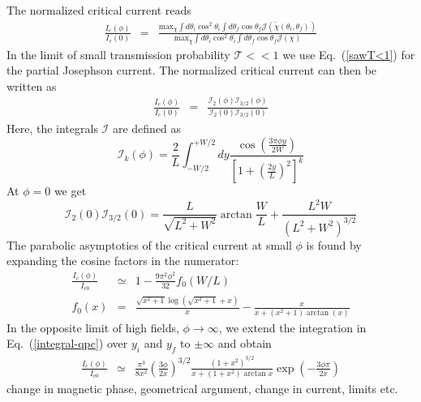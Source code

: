 The normalized critical current reads
\begin{eqnarray}
\frac{I_c(\phi)}{I_c(0)} &=& \frac{ \text{max}_{\chi} \int d \theta_i \cos^2 \theta_i\int d \theta_f \cos \theta_f \mathcal{J}(\tilde{\chi}(\theta_i, \theta_f)) }{ \text{max}_{\chi} \int d \theta_i \cos^2 \theta_i\int d \theta_f \cos \theta_f \mathcal{J}(\chi) }
\end{eqnarray}
In the limit of small transmission probability $\mathcal{T} << 1$ we use Eq.~(\ref{sawT<1}) for the partial Josephson current. The normalized critical current can then be written as 
\begin{eqnarray}
\frac{I_c(\phi)}{I_c(0)} &=& \frac{\mathcal{I}_2(\phi)\mathcal{I}_{3/2}(\phi)}{\mathcal{I}_2(0)\mathcal{I}_{3/2}(0)}
\end{eqnarray}
Here, the integrals $\mathcal{I}$ are defined as
\begin{equation}
\mathcal{I}_k(\phi) = \frac{2}{L}\int_{-W/2}^{+W/2}dy \frac{\cos\left(\frac{3\pi\phi y}{2W}\right)}{\left[1 + \left(\frac{2y}{L}\right)^2 \right]^k}
\label{integral-qpc}
\end{equation}
At $\phi=0$ we get
\begin{equation}
\mathcal{I}_2(0)\mathcal{I}_{3/2}(0) =
\frac{L}{\sqrt{L^2+W^2}}\arctan\frac{W}{L} + \frac{L^2W}{(L^2+W^2)^{3/2}}
\label{Ic-0}
\end{equation}
The parabolic asymptotics of the critical current at small $\phi$ is found by expanding
the cosine factors in the numerator:
\begin{eqnarray}
\frac{I_c(\phi)}{I_{c0}}&\simeq& 1 - \frac{9\pi ^2 \phi^2 }{32} f_0(W/L) \\
f_0(x) &=& \frac{\sqrt{x^2+1} \log \left(\sqrt{x^2+1}+x\right)}{x}- \frac{x}{x+\left(x^2+1\right) \arctan(x)} 
\end{eqnarray}
In the opposite limit of high fields, $\phi\to \infty$, we extend the integration in Eq.~(\ref{integral-qpc}) over $y_i$ and $y_f$ to $\pm \infty$ and obtain
\begin{eqnarray}
\frac{I_c(\phi)}{I_{c0}} &\simeq& \frac{\pi^3 }{8x^2}\left(\frac{3\phi}{2x}\right)^{3/2}\frac{\left(1+x^2\right)^{3/2}}{x + \left(1+x^2\right)\arctan x}\exp\left(-\frac{3\phi\pi}{2x}\right)
\label{large-phi}
\end{eqnarray}
change in magnetic phase, geometrical argument, change in current, limits etc. 




